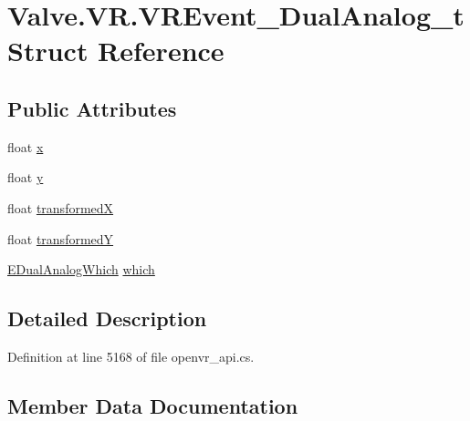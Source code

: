 \hypertarget{struct_valve_1_1_v_r_1_1_v_r_event___dual_analog__t}{}\section{Valve.\+V\+R.\+V\+R\+Event\+\_\+\+Dual\+Analog\+\_\+t Struct Reference}
\label{struct_valve_1_1_v_r_1_1_v_r_event___dual_analog__t}
\subsection*{Public Attributes}
\begin{DoxyCompactItemize}
\item 
float \mbox{\hyperlink{struct_valve_1_1_v_r_1_1_v_r_event___dual_analog__t_aa5781b009193528a4c644f08858230fa}{x}}
\item 
float \mbox{\hyperlink{struct_valve_1_1_v_r_1_1_v_r_event___dual_analog__t_a06fb4b0df215b4201e69f1c75b8d3f27}{y}}
\item 
float \mbox{\hyperlink{struct_valve_1_1_v_r_1_1_v_r_event___dual_analog__t_af0335a9ec3c62bf618b43cd4c4186add}{transformedX}}
\item 
float \mbox{\hyperlink{struct_valve_1_1_v_r_1_1_v_r_event___dual_analog__t_a24f6eabf39547c5dc7f672c839aa7ae6}{transformedY}}
\item 
\mbox{\hyperlink{namespace_valve_1_1_v_r_a3a5fe210bea8b993a1ad42f680119e90}{E\+Dual\+Analog\+Which}} \mbox{\hyperlink{struct_valve_1_1_v_r_1_1_v_r_event___dual_analog__t_a6bad331946a1ec382b3faf67db6a8aff}{which}}
\end{DoxyCompactItemize}


\subsection{Detailed Description}


Definition at line 5168 of file openvr\+\_\+api.\+cs.



\subsection{Member Data Documentation}
\mbox{\label{struct_valve_1_1_v_r_1_1_v_r_event___dual_analog__t_af0335a9ec3c62bf618b43cd4c4186add}} 
